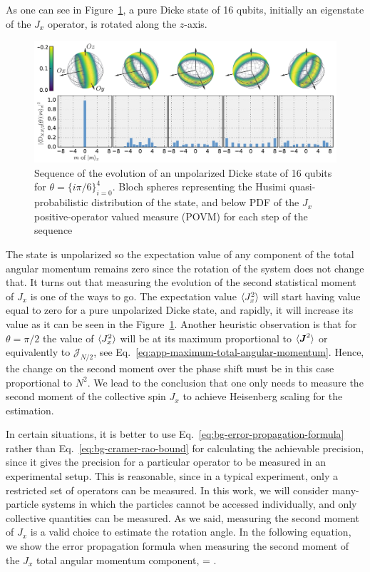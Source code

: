 As one can see in Figure~\ref{fig:vd-secuence-evo}, a pure Dicke state of 16 qubits, initially an eigenstate of the $J_x$ operator, is rotated along the $z$-axis.
\begin{figure}[htp]
  \centering
  \includegraphics[scale=.65]{img/plots/VD_evolution_of_dicke.pdf}
  \caption[Sequence of Dicke state evolution]{Sequence of the evolution of an unpolarized Dicke state of 16 qubits for $\theta=\{i\pi/6\}_{i=0}^4$. Bloch spheres representing the Husimi quasi-probabilistic distribution of the state, and below PDF of the $J_x$ positive-operator valued measure (POVM) for each step of the sequence}
  \label{fig:vd-secuence-evo}
\end{figure}
The state is unpolarized so the expectation value of any component of the total angular momentum remains zero since the rotation of the system does not change that.
It turns out that measuring the evolution of the second statistical moment of $J_x$ is one of the ways to go.
The expectation value $\langle J_x^2 \rangle$ will start having value equal to zero for a pure unpolarized Dicke state, and rapidly, it will increase its value as it can be seen in the Figure~\ref{fig:vd-secuence-evo}.
Another heuristic observation is that for $\theta=\pi/2$ the value of $\langle J_x^2 \rangle$ will be at its maximum proportional to $\langle \boldsymbol{J}^2 \rangle$ or equivalently to $\mathcal{J}_{N/2}$, see Eq.~\eqref{eq:app-maximum-total-angular-momentum}.
Hence, the change on the second moment over the phase shift must be in this case proportional to $N^2$.
We lead to the conclusion that one only needs to measure the second moment of the collective spin $J_x$ to achieve Heisenberg scaling for the estimation.

In certain situations, it is better to use Eq.~\eqref{eq:bg-error-propagation-formula} rather than Eq.~\eqref{eq:bg-cramer-rao-bound} for calculating the achievable precision, since it gives the precision for a particular operator to be measured in an experimental setup.
This is reasonable, since in a typical experiment, only a restricted set of operators can be measured.
In this work, we will consider many-particle systems in which the particles cannot be accessed individually, and only collective quantities can be measured.
As we said, measuring the second moment of $J_x$ is a valid choice to estimate the rotation angle.
In the following equation, we show the error propagation formula when measuring the second moment of the $J_x$ total angular momentum component,
\be
  \varinv{\theta} = .
  \label{eq:vd-error-propagation}
\ee

